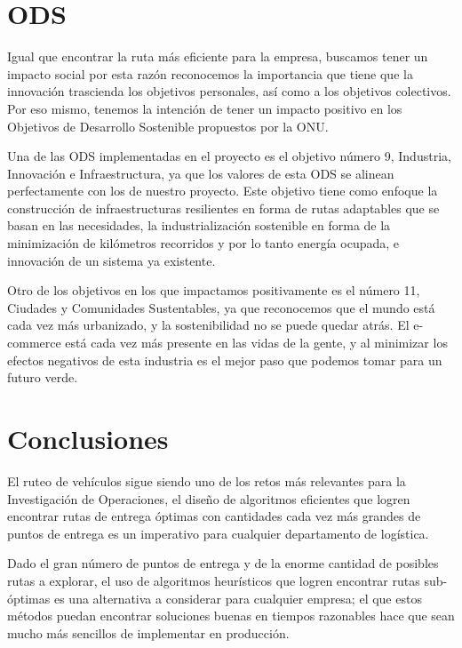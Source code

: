 \documentclass[journal]{IEEEtran}
\begin{document}
    \section{ODS}
    
        Igual que encontrar la ruta más eficiente para la empresa, buscamos tener un impacto social por esta razón reconocemos la importancia que tiene que la innovación trascienda los objetivos personales, así como a los objetivos colectivos. Por eso mismo, tenemos la intención de tener un impacto positivo en los Objetivos de Desarrollo Sostenible propuestos por la ONU. 
        
        Una de las ODS implementadas en el proyecto es el objetivo número 9,  Industria, Innovación e Infraestructura, ya que los valores de esta ODS se alinean perfectamente con los de nuestro proyecto. Este objetivo tiene como enfoque la construcción de infraestructuras resilientes en forma de rutas adaptables que se basan en las necesidades, la industrialización sostenible en forma de la minimización de kilómetros recorridos y por lo tanto energía ocupada, e innovación de un sistema ya existente. 
        
        Otro de los objetivos en los que impactamos positivamente es el número 11, Ciudades y Comunidades Sustentables, ya que reconocemos que el mundo está cada vez más urbanizado, y la sostenibilidad no se puede quedar atrás. El e-commerce está cada vez más presente en las vidas de la gente, y al minimizar los efectos negativos de esta industria es el mejor paso que podemos tomar para un futuro verde. 

    \section{Conclusiones}    
        
        El ruteo de vehículos sigue siendo uno de los retos más relevantes para la Investigación de Operaciones, el diseño de algoritmos eficientes que logren encontrar rutas de entrega óptimas con cantidades cada vez más grandes de puntos de entrega es un imperativo para cualquier departamento de logística.
        
        Dado el gran número de puntos de entrega y de la enorme cantidad de posibles rutas a explorar, el uso de algoritmos heurísticos que logren encontrar rutas sub-óptimas es una alternativa a considerar para cualquier empresa; el que estos métodos puedan encontrar soluciones buenas en tiempos razonables hace que sean mucho más sencillos de implementar en producción.
        
\end{document}
